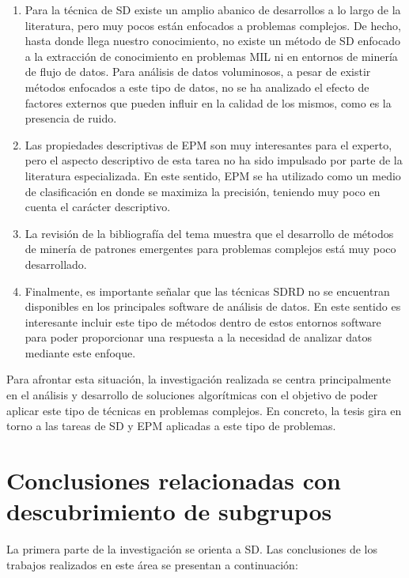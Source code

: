\documentclass[c5paper,10pt,twoside]{book}	   	%
\begin{document}
\begin{enumerate}

	\item Para la técnica de \ac{SD} existe un amplio abanico de desarrollos a lo largo de la literatura, pero muy pocos están enfocados a problemas complejos. De hecho, hasta donde llega nuestro conocimiento, no existe un método de \ac{SD} enfocado a la extracción de conocimiento en problemas \ac{MIL} ni en entornos de minería de flujo de datos. Para análisis de datos voluminosos, a pesar de existir métodos enfocados a este tipo de datos, no se ha analizado el efecto de factores externos que pueden influir en la calidad de los mismos, como es la presencia de ruido.
	
	\item Las propiedades descriptivas de \ac{EPM} son muy interesantes para el experto, pero el aspecto descriptivo de esta tarea no ha sido impulsado por parte de la literatura especializada. En este sentido, \ac{EPM} se ha utilizado como un medio de clasificación en donde se maximiza la precisión, teniendo muy poco en cuenta el carácter descriptivo.
	
	\item La revisión de la bibliografía del tema muestra que el desarrollo de métodos de minería de patrones emergentes para problemas complejos está muy poco desarrollado.
	
	\item Finalmente, es importante señalar que las técnicas \ac{SDRD} no se encuentran disponibles en los principales software de análisis de datos. En este sentido es interesante incluir este tipo de métodos dentro de estos entornos software para poder proporcionar una respuesta a la necesidad de analizar datos mediante este enfoque.
\end{enumerate}

Para afrontar esta situación, la investigación realizada se centra principalmente en el análisis y desarrollo de soluciones algorítmicas con el objetivo de poder aplicar este tipo de técnicas en problemas complejos. En concreto, la tesis gira en torno a las tareas de \ac{SD} y \ac{EPM} aplicadas a este tipo de problemas.



\section{Conclusiones relacionadas con descubrimiento de subgrupos}

La primera parte de la investigación se orienta a \ac{SD}. Las conclusiones de los trabajos realizados en este área se presentan a continuación:
\end{document}

